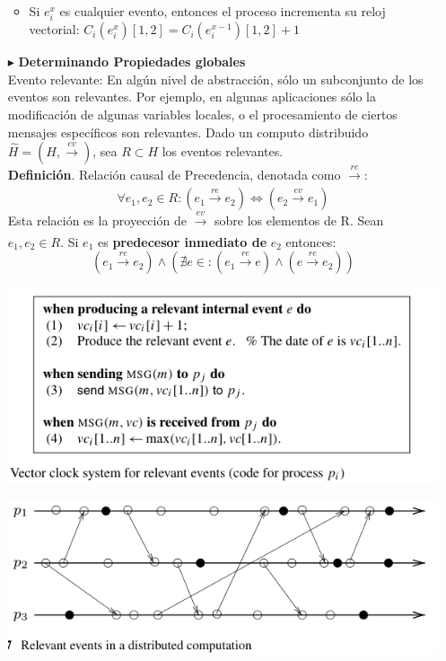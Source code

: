 \begin{itemize}
\begin{itemize}
\item Si $e_i^x$ es cualquier evento, entonces el proceso incrementa su reloj vectorial: 
$C_i(e_i^x)[1,2] = C_i(e_i^{x-1})[1,2]+1$
\end{itemize}



\item  [$\blacktriangleright$] {\bf Determinando Propiedades globales}\\

Evento relevante: En algún nivel de abstracción, sólo un subconjunto de los eventos 
son relevantes. Por ejemplo, en algunas aplicaciones sólo la modificación de algunas 
variables locales, o el procesamiento de ciertos mensajes específicos son relevantes. 
Dado un computo distribuido $\widehat{H}=(H,\xrightarrow[]{ev})$, sea $R\subset H$ 
los eventos relevantes.\\

{\bf Definición}. Relación causal de Precedencia, denotada como $\xrightarrow[]{re}$:
$$\forall e_1,e_2 \in R : (e_1 \xrightarrow[]{re} e_2) \iff (e_2 \xrightarrow[]{ev} e_1)$$
Esta relación es la proyección de $\xrightarrow[]{ev}$ sobre los elementos de R.
Sean $e_1,e_2 \in R$. Si $e_1$ es \textbf{predecesor inmediato de} $e_2$ entonces:
$$(e_1 \xrightarrow[]{re} e_2) \wedge (\nexists e \in : (e_1 \xrightarrow[]{re} e) \wedge (e \xrightarrow[]{re}e_2))$$

\begin{center}
    \includegraphics[scale=0.7]{Imagenes/eventosRelevantes02.png}
    \end{center}
\begin{center}
    \includegraphics[scale=0.6]{Imagenes/eventosRelevantes01.png}
    \end{center}


\end{itemize}
